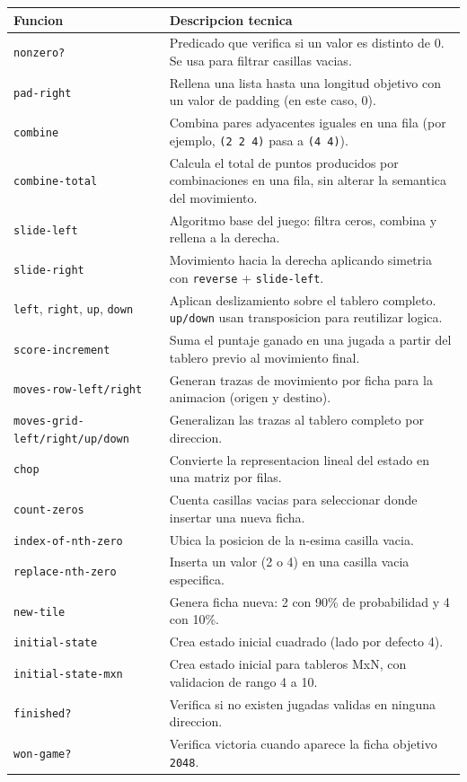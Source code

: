 \documentclass[12pt,a4paper]{article}
\begin{document}
\begin{longtable}{p{}p{}}
\toprule
\textbf{Funcion} & \textbf{Descripcion tecnica} \\
\midrule
\endhead
\texttt{nonzero?} & Predicado que verifica si un valor es distinto de 0. Se usa para filtrar casillas vacias. \\
\texttt{pad-right} & Rellena una lista hasta una longitud objetivo con un valor de padding (en este caso, 0). \\
\texttt{combine} & Combina pares adyacentes iguales en una fila (por ejemplo, \texttt{(2 2 4)} pasa a \texttt{(4 4)}). \\
\texttt{combine-total} & Calcula el total de puntos producidos por combinaciones en una fila, sin alterar la semantica del movimiento. \\
\texttt{slide-left} & Algoritmo base del juego: filtra ceros, combina y rellena a la derecha. \\
\texttt{slide-right} & Movimiento hacia la derecha aplicando simetria con \texttt{reverse} + \texttt{slide-left}. \\
\texttt{left}, \texttt{right}, \texttt{up}, \texttt{down} & Aplican deslizamiento sobre el tablero completo. \texttt{up/down} usan transposicion para reutilizar logica. \\
\texttt{score-increment} & Suma el puntaje ganado en una jugada a partir del tablero previo al movimiento final. \\
\texttt{moves-row-left/right} & Generan trazas de movimiento por ficha para la animacion (origen y destino). \\
\texttt{moves-grid-left/right/up/down} & Generalizan las trazas al tablero completo por direccion. \\
\texttt{chop} & Convierte la representacion lineal del estado en una matriz por filas. \\
\texttt{count-zeros} & Cuenta casillas vacias para seleccionar donde insertar una nueva ficha. \\
\texttt{index-of-nth-zero} & Ubica la posicion de la n-esima casilla vacia. \\
\texttt{replace-nth-zero} & Inserta un valor (2 o 4) en una casilla vacia especifica. \\
\texttt{new-tile} & Genera ficha nueva: 2 con 90\% de probabilidad y 4 con 10\%. \\
\texttt{initial-state} & Crea estado inicial cuadrado (lado por defecto 4). \\
\texttt{initial-state-mxn} & Crea estado inicial para tableros MxN, con validacion de rango 4 a 10. \\
\texttt{finished?} & Verifica si no existen jugadas validas en ninguna direccion. \\
\texttt{won-game?} & Verifica victoria cuando aparece la ficha objetivo \texttt{2048}. \\
\bottomrule
\end{longtable}
\end{document}
